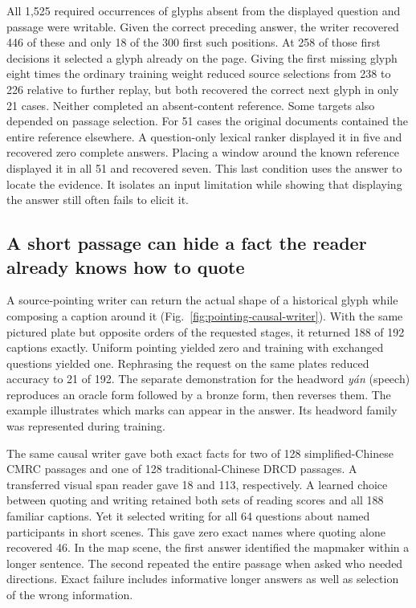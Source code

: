 \documentclass[12pt,a4paper]{article}
\providecommand{\DIFadd}[1]{{\protect\color{blue} \sf #1}} %
\begin{document}
\DIFadd{All 1,525 required occurrences of glyphs absent from the displayed question and passage were writable. Given the correct preceding answer, the writer recovered 446 of these and only 18 of the 300 first such positions. At 258 of those first decisions it selected a glyph already on the page. Giving the first missing glyph eight times the ordinary training weight reduced source selections from 238 to 226 relative to further replay, but both recovered the correct next glyph in only 21 cases. Neither completed an absent-content reference. Some targets also depended on passage selection. For 51 cases the original documents contained the entire reference elsewhere. A question-only lexical ranker displayed it in five and recovered zero complete answers. Placing a window around the known reference displayed it in all 51 and recovered seven. This last condition uses the answer to locate the evidence. It isolates an input limitation while showing that displaying the answer still often fails to elicit it.
}

\subsection*{\DIFadd{A short passage can hide a fact the reader already knows how to quote}}
\DIFadd{A source-pointing writer can return the actual shape of a historical glyph while composing a caption around it (Fig.~\ref{fig:pointing-causal-writer}). With the same pictured plate but opposite orders of the requested stages, it returned 188 of 192 captions exactly. Uniform pointing yielded zero and training with exchanged questions yielded one. Rephrasing the request on the same plates reduced accuracy to 21 of 192. The separate demonstration for the headword \textit{yán} (speech) reproduces an oracle form followed by a bronze form, then reverses them. The example illustrates which marks can appear in the answer. Its headword family was represented during training.
}

\DIFadd{The same causal writer gave both exact facts for two of 128 simplified-Chinese CMRC passages and one of 128 traditional-Chinese DRCD passages. A transferred visual span reader gave 18 and 113, respectively. A learned choice between quoting and writing retained both sets of reading scores and all 188 familiar captions. Yet it selected writing for all 64 questions about named participants in short scenes. This gave zero exact names where quoting alone recovered 46. In the map scene, the first answer identified the mapmaker within a longer sentence. The second repeated the entire passage when asked who needed directions. Exact failure includes informative longer answers as well as selection of the wrong information.
}
\end{document}
